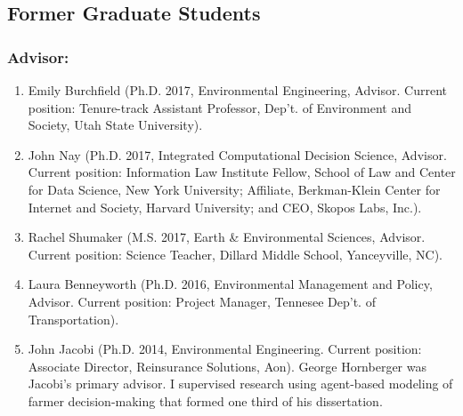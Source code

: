 \documentclass[10pt]{article}
\begin{document}
    \subsection{Former Graduate Students}
    \subsubsection{Advisor:}
    \begin{enumerate}
	\item Emily Burchfield (Ph.D. 2017, Environmental Engineering, Advisor. Current position: Tenure-track Assistant Professor, Dep't. of Environment and Society, Utah State University).
	\item John Nay (Ph.D. 2017, Integrated Computational Decision Science, Advisor. Current position: Information Law Institute Fellow, School of Law and Center for Data Science, New York University; Affiliate, Berkman-Klein Center for Internet and Society, Harvard University; and CEO, Skopos Labs, Inc.).
	\item Rachel Shumaker (M.S. 2017, Earth \& Environmental Sciences, Advisor. Current position: Science Teacher, Dillard Middle School, Yanceyville, NC).
	\item Laura Benneyworth (Ph.D. 2016, Environmental Management and Policy, Advisor. Current position: Project Manager, Tennesee Dep't. of Transportation).
	\item John Jacobi (Ph.D. 2014, Environmental Engineering. Current position: Associate Director, Reinsurance Solutions, Aon). George Hornberger was Jacobi's primary advisor. I supervised research using agent-based modeling of farmer decision-making that formed one third of his dissertation.
    \end{enumerate}
\end{document}
